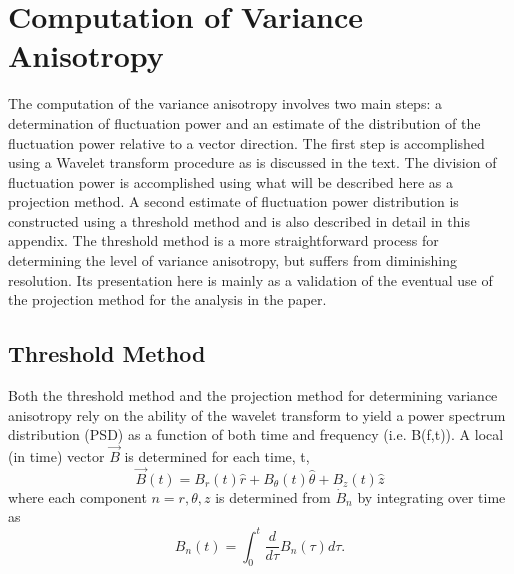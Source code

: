 \documentclass[aip,prl,amsmath,amssymb,reprint,superscriptaddress]{revtex4-1} %
\begin{document}
\appendix

\section{Computation of Variance Anisotropy}

The computation of the variance anisotropy involves two main steps: a determination of fluctuation power and an estimate of the distribution of the fluctuation power relative to a vector direction. The first step is accomplished using a Wavelet transform procedure as is discussed in the text. The division of fluctuation power is accomplished using what will be described here as a projection method. A second estimate of fluctuation power distribution is constructed using a threshold method and is also described in detail in this appendix. The threshold method is a more straightforward process for determining the level of variance anisotropy, but suffers from diminishing resolution. Its presentation here is mainly as a validation of the eventual use of the projection method for the analysis in the paper. 

\subsection{Threshold Method}

Both the threshold method and the projection method for determining variance anisotropy rely on the ability of the wavelet transform to yield a power spectrum distribution (PSD) as a function of both time and frequency (i.e. B(f,t)). A local (in time) vector $\vec{B}$ is determined for each time, t,
\begin{equation}
\vec{B}(t) = B_{r}(t)\hat{r} + B_{\theta}(t)\hat{\theta} + B_{z}(t)\hat{z}
\label{eq:Bvector}
\end{equation}
where each component $n=r,\theta,z$ is determined from $\dot{B}_{n}$ by integrating over time as
\begin{equation}
B_{n}(t) = \int_{0}^{t} \frac{d}{d\tau}B_{n}(\tau)d\tau.
\label{eq:Bintegrated}
\end{equation}
\end{document}

